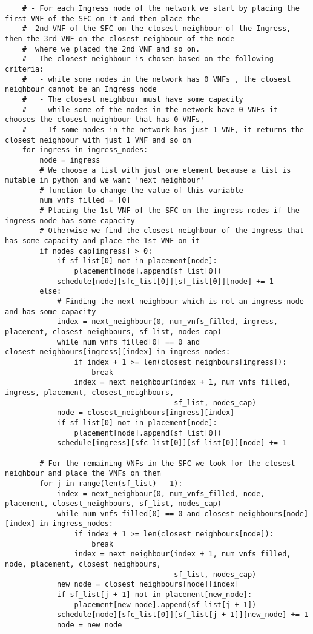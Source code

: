 \begin{lstlisting}
    # - For each Ingress node of the network we start by placing the first VNF of the SFC on it and then place the
    #  2nd VNF of the SFC on the closest neighbour of the Ingress, then the 3rd VNF on the closest neighbour of the node
    #  where we placed the 2nd VNF and so on.
    # - The closest neighbour is chosen based on the following criteria:
    #   - while some nodes in the network has 0 VNFs , the closest neighbour cannot be an Ingress node
    #   - The closest neighbour must have some capacity
    #   - while some of the nodes in the network have 0 VNFs it chooses the closest neighbour that has 0 VNFs,
    #     If some nodes in the network has just 1 VNF, it returns the closest neighbour with just 1 VNF and so on
    for ingress in ingress_nodes:
        node = ingress
        # We choose a list with just one element because a list is mutable in python and we want 'next_neighbour'
        # function to change the value of this variable
        num_vnfs_filled = [0]
        # Placing the 1st VNF of the SFC on the ingress nodes if the ingress node has some capacity
        # Otherwise we find the closest neighbour of the Ingress that has some capacity and place the 1st VNF on it
        if nodes_cap[ingress] > 0:
            if sf_list[0] not in placement[node]:
                placement[node].append(sf_list[0])
            schedule[node][sfc_list[0]][sf_list[0]][node] += 1
        else:
            # Finding the next neighbour which is not an ingress node and has some capacity
            index = next_neighbour(0, num_vnfs_filled, ingress, placement, closest_neighbours, sf_list, nodes_cap)
            while num_vnfs_filled[0] == 0 and closest_neighbours[ingress][index] in ingress_nodes:
                if index + 1 >= len(closest_neighbours[ingress]):
                    break
                index = next_neighbour(index + 1, num_vnfs_filled, ingress, placement, closest_neighbours,
                                       sf_list, nodes_cap)
            node = closest_neighbours[ingress][index]
            if sf_list[0] not in placement[node]:
                placement[node].append(sf_list[0])
            schedule[ingress][sfc_list[0]][sf_list[0]][node] += 1

        # For the remaining VNFs in the SFC we look for the closest neighbour and place the VNFs on them
        for j in range(len(sf_list) - 1):
            index = next_neighbour(0, num_vnfs_filled, node, placement, closest_neighbours, sf_list, nodes_cap)
            while num_vnfs_filled[0] == 0 and closest_neighbours[node][index] in ingress_nodes:
                if index + 1 >= len(closest_neighbours[node]):
                    break
                index = next_neighbour(index + 1, num_vnfs_filled, node, placement, closest_neighbours,
                                       sf_list, nodes_cap)
            new_node = closest_neighbours[node][index]
            if sf_list[j + 1] not in placement[new_node]:
                placement[new_node].append(sf_list[j + 1])
            schedule[node][sfc_list[0]][sf_list[j + 1]][new_node] += 1
            node = new_node


\end{lstlisting}

